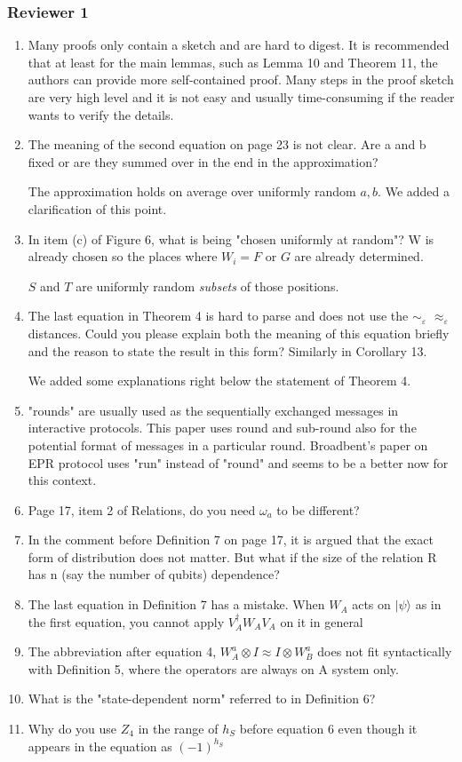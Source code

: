 \documentclass[12pt]{article}
\newcommand{\eps}{\varepsilon}
\newcommand{\ket}[1]{|#1\rangle}
\begin{document}
\subsubsection*{Reviewer 1}
\begin{enumerate}
\item Many proofs only contain a sketch and are hard to digest. It is recommended that at least for the main lemmas, such as Lemma 10 and Theorem 11, the authors can provide more self-contained proof. Many steps in the proof sketch are very high level and it is not easy and usually time-consuming if the reader wants to verify the details.
\item The meaning of the second equation on page 23 is not clear. Are a and b fixed or are they summed over in the end in the approximation?

				{\color{blue}The approximation holds on average over uniformly random $a,b$. We added a clarification of this point.}
				
\item In item (c) of Figure 6, what is being "chosen uniformly at random"? W is already chosen so the places where $W_i = F$ or $G$ are already determined.

{\color{blue} $S$ and $T$ are uniformly random \emph{subsets} of those positions.}

\item The last equation in Theorem 4 is hard to parse and does not use the $\sim_\eps$ $\approx_\eps$ distances. Could you please explain both the meaning of this equation briefly and the reason to state the result in this form? Similarly in Corollary 13.

{\color{blue} We added some explanations right below the statement of Theorem 4.}

\item "rounds" are usually used as the sequentially exchanged messages in interactive protocols. This paper uses round and sub-round also for the potential format of messages in a particular round. Broadbent's paper on EPR protocol uses "run" instead of "round" and seems to be a better now for this context.
\item Page 17, item 2 of Relations, do you need $\omega_a$ to be different?
\item In the comment before Definition 7 on page 17, it is argued that the exact form of distribution does not matter. But what if the size of the relation R has n (say the number of qubits) dependence?
\item The last equation in Definition 7 has a mistake. When $W_A$ acts on $\ket{\psi}$ as in the first equation, you cannot apply $V^\dagger_A W_A V_A$ on it in general
\item The abbreviation after equation 4, $W^a_A \otimes I \approx I \otimes W^a_B$ does not fit syntactically with Definition 5, where the operators are always on A system only.
\item What is the "state-dependent norm" referred to in Definition 6?
\item Why do you use $Z_4$ in the range of $h_S$ before equation 6 even though it appears in the equation as $(-1)^{h_S}$
\end{enumerate}
\end{document}
